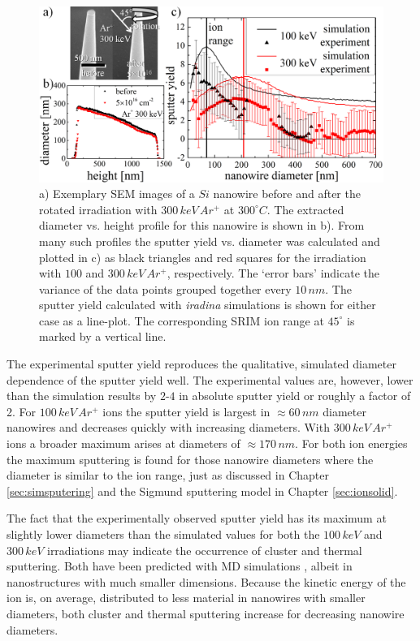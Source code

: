 \begin{figure}[th]
	\centering
		\includegraphics[width=.95\textwidth]{images/sputter_exp.png}
	\caption{a) Exemplary SEM images of a $Si$ nanowire before and after the rotated irradiation with $300\,keV\,Ar^+$ at $300^\circ C$. The extracted diameter vs. height profile for this nanowire is shown in b). From many such profiles the sputter yield vs. diameter was calculated and plotted in c) as black triangles and red squares for the irradiation with $100$ and $300\,keV\,Ar^+$, respectively. The `error bars' indicate the variance of the data points grouped together every $10\,nm$. The sputter yield calculated with \emph{iradina} simulations is shown for either case as a line-plot. The corresponding SRIM ion range at $45^\circ$ is marked by a vertical line.} 
	\label{sputtering_exp}
\end{figure} 

The experimental sputter yield reproduces the qualitative, simulated diameter dependence of the sputter yield well. The experimental values are, however, lower than the simulation results by $2$-$4$ in absolute sputter yield or roughly a factor of 2. For $100\,keV\,Ar^+$ ions the sputter yield is largest in $\approx 60\,nm$ diameter nanowires and decreases quickly with increasing diameters. With $300\,keV\,Ar^+$ ions a broader maximum arises at diameters of $\approx 170\,nm$. For both ion energies the maximum sputtering is found for those nanowire diameters where the diameter is similar to the ion range, just as discussed in Chapter \ref{sec:simsputering} and the Sigmund sputtering model in Chapter \ref{sec:ionsolid}.   

The fact that the experimentally observed sputter yield has its maximum at slightly lower diameters than the simulated values for both the $100\,keV$ and $300\,keV$ irradiations may indicate the occurrence of cluster and thermal sputtering. Both have been predicted with MD simulations \cite{nietiadi_sputtering_2014,urbassek_sputter_2015,anders_sputtering_2015}, albeit in nanostructures with much smaller dimensions. Because the kinetic energy of the ion is, on average, distributed to less material in nanowires with smaller diameters, both cluster and thermal sputtering increase for decreasing nanowire diameters.

